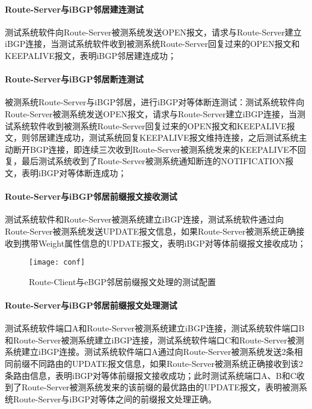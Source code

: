 \paragraph{Route-Server与iBGP邻居建连测试}
测试系统软件向Route-Server被测系统发送OPEN报文，请求与Route-Server建立iBGP连接，当测试系统软件收到被测系统Route-Server回复过来的OPEN报文和KEEPALIVE报文，表明iBGP邻居建连成功；

\paragraph{Route-Server与iBGP邻居断连测试}
被测系统Route-Server与iBGP邻居，进行iBGP对等体断连测试：测试系统软件向Route-Server被测系统发送OPEN报文，请求与Route-Server建立iBGP连接，当测试系统软件收到被测系统Route-Server回复过来的OPEN报文和KEEPALIVE报文，则邻居建连成功，测试系统回复KEEPALIVE报文维持连接，之后测试系统主动断开BGP连接，即连续三次收到Route-Server被测系统发来的KEEPALIVE不回复，最后测试系统收到了Route-Server被测系统通知断连的NOTIFICATION报文，表明iBGP对等体断连成功；

\paragraph{Route-Server与iBGP邻居前缀报文接收测试}
测试系统软件和Route-Server被测系统建立iBGP连接，测试系统软件通过向Route-Server被测系统发送UPDATE报文信息，如果Route-Server被测系统正确接收到携带Weight属性信息的UPDATE报文，表明iBGP对等体前缀报文接收成功；

\begin{figure}
  \centering
  \texttt{[image: conf]}
  \caption{Route-Client与eBGP邻居前缀报文处理的测试配置}
  \label{fig:conf}
\end{figure}

\paragraph{Route-Server与iBGP邻居前缀报文处理测试}
测试系统软件端口A和Route-Server被测系统建立iBGP连接，测试系统软件端口B和Route-Server被测系统建立iBGP连接，测试系统软件端口C和Route-Server被测系统建立iBGP连接。测试系统软件端口A通过向Route-Server被测系统发送2条相同前缀不同路由的UPDATE报文信息，如果Route-Server被测系统正确接收到该2条路由信息，表明iBGP对等体前缀报文接收成功；此时测试系统端口A、B和C收到了Route-Server被测系统发来的该前缀的最优路由的UPDATE报文，表明被测系统Route-Server与iBGP对等体之间的前缀报文处理正确。




